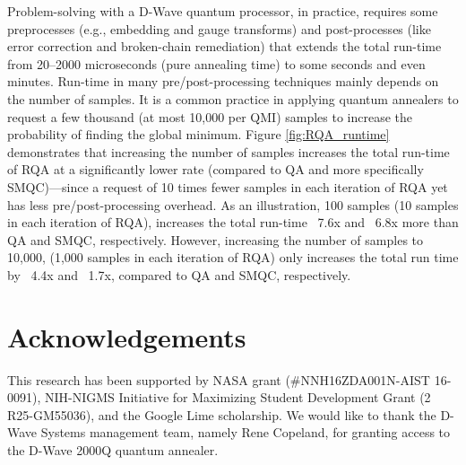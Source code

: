 \documentclass[fleqn,10pt]{wlscirep}
\begin{document}
Problem-solving with a D-Wave quantum processor, in practice, requires some preprocesses (e.g., embedding and gauge transforms) and post-processes (like error correction and broken-chain remediation) that extends the total run-time from 20–2000 microseconds (pure annealing time) to some seconds and even minutes. Run-time in many pre/post-processing techniques mainly depends on the number of samples. It is a common practice in applying quantum annealers to request a few thousand (at most 10,000 per QMI) samples to increase the probability of finding the global minimum. 
Figure \ref{fig:RQA_runtime} demonstrates that increasing the number of samples increases the total run-time of RQA at a significantly lower rate (compared to QA and more specifically SMQC)—since a request of 10 times fewer samples in each iteration of RQA yet  has less pre/post-processing overhead. As an illustration, 100 samples (10 samples in each iteration of RQA), increases the total run-time ~7.6x and ~6.8x more than QA and SMQC, respectively. However, increasing the number of samples to 10,000, (1,000 samples in each iteration of RQA) only increases the total run time by ~4.4x and ~1.7x, compared to QA and SMQC, respectively. 

\section*{Acknowledgements}
This research has been supported by NASA grant (\#NNH16ZDA001N-AIST 16-0091), NIH-NIGMS Initiative for Maximizing Student Development Grant (2 R25-GM55036), and the Google Lime scholarship. We would like to thank the D-Wave Systems management team, namely Rene Copeland, for granting access to the D-Wave 2000Q quantum annealer.



	
\end{document}
